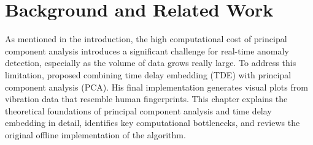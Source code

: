 \chapter{Background and Related Work}
As mentioned in the introduction, the high computational cost of principal component analysis introduces a significant challenge for real-time anomaly detection, especially as the volume of data grows really large. To address this limitation, \parencite[p.~1]{rakuschek2025visual} proposed combining time delay embedding (TDE) with principal component analysis (PCA). His final implementation generates visual plots from vibration data that resemble human fingerprints. This chapter explains the theoretical foundations of principal component analysis and time delay embedding in detail, identifies key computational bottlenecks, and reviews the original offline implementation of the algorithm.






